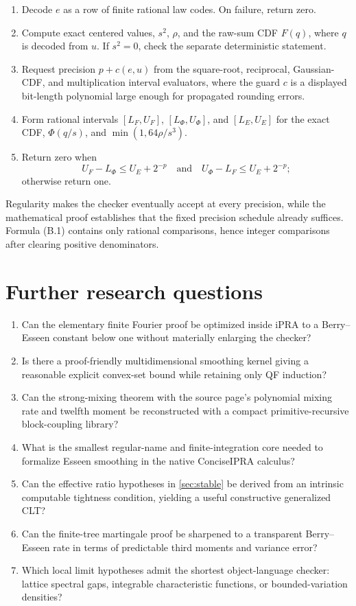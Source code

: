 \documentclass[11pt]{article}
\newcommand{\PhiN}{\Phi}
\newcommand{\ipra}{\mathrm{iPRA}}
\begin{document}
\begin{enumerate}
\item Decode \(e\) as a row of finite rational law codes.  On failure, return
zero.
\item Compute exact centered values, \(s^2\), \(\rho\), and the raw-sum CDF
\(F(q)\), where \(q\) is decoded from \(u\).  If \(s^2=0\), check the
separate deterministic statement.
\item Request precision \(p+c(e,u)\) from the square-root, reciprocal,
Gaussian-CDF, and multiplication interval evaluators, where the guard
\(c\) is a displayed bit-length polynomial large enough for propagated
rounding errors.
\item Form rational intervals \([L_F,U_F]\), \([L_\Phi,U_\Phi]\), and
\([L_E,U_E]\) for the exact CDF, \(\PhiN(q/s)\), and
\(\min(1,64\rho/s^3)\).
\item Return zero when
\[
 U_F-L_\Phi\le U_E+2^{-p}
 \quad\text{and}\quad
 U_\Phi-L_F\le U_E+2^{-p};                            \tag{B.1}
\]
otherwise return one.
\end{enumerate}

Regularity makes the checker eventually accept at every precision, while the
mathematical proof establishes that the fixed precision schedule already
suffices.  Formula (B.1) contains only rational comparisons, hence integer
comparisons after clearing positive denominators.

\section{Further research questions}

\begin{enumerate}
\item Can the elementary finite Fourier proof be optimized inside \(\ipra\)
to a Berry--Esseen constant below one without materially enlarging the
checker?
\item Is there a proof-friendly multidimensional smoothing kernel giving a
reasonable explicit convex-set bound while retaining only QF induction?
\item Can the strong-mixing theorem with the source page's polynomial mixing
rate and twelfth moment be reconstructed with a compact primitive-recursive
block-coupling library?
\item What is the smallest regular-name and finite-integration core needed to
formalize Esseen smoothing in the native ConciseIPRA calculus?
\item Can the effective ratio hypotheses in \cref{sec:stable} be derived from
an intrinsic computable tightness condition, yielding a useful constructive
generalized CLT?
\item Can the finite-tree martingale proof be sharpened to a transparent
Berry--Esseen rate in terms of predictable third moments and variance error?
\item Which local limit hypotheses admit the shortest object-language
checker: lattice spectral gaps, integrable characteristic functions, or
bounded-variation densities?
\end{enumerate}
\end{document}
